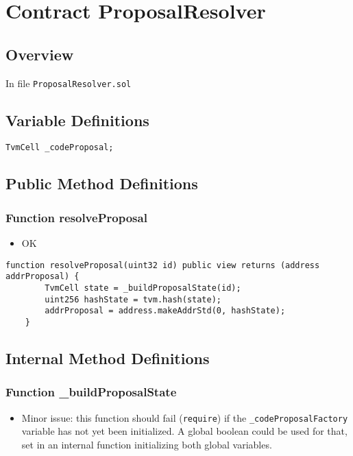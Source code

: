 
\chapter{Contract ProposalResolver}

\minitoc

\section{Overview}


In file {\tt ProposalResolver.sol}

\section{Variable Definitions}

\begin{lstlisting}[firstnumber=6]
    TvmCell _codeProposal;
\end{lstlisting}

\section{Public Method Definitions}


\subsection{Function resolveProposal}

\begin{itemize}
\item OK
\end{itemize}

\begin{lstlisting}[firstnumber=8]
    function resolveProposal(uint32 id) public view returns (address addrProposal) {
        TvmCell state = _buildProposalState(id);
        uint256 hashState = tvm.hash(state);
        addrProposal = address.makeAddrStd(0, hashState);
    }
\end{lstlisting}

\section{Internal Method Definitions}


\subsection{Function \_{}buildProposalState}

\begin{itemize}
\item Minor issue: this function should fail ({\tt require}) if the
  {\tt \_codeProposalFactory} variable has not yet been initialized. A global
  boolean could be used for that, set in an internal function
  initializing both global variables.
\end{itemize}

